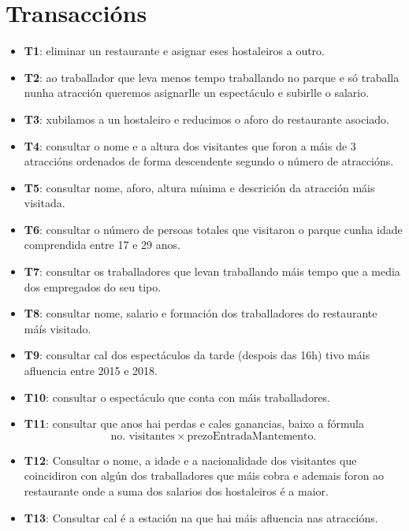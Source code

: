 \documentclass[12pt,a4paper]{book}
\theoremstyle{definition}
\theoremstyle{break}
\begin{document}
	\section{Transaccións}
	\begin{itemize}
		\item \textbf{T1}: eliminar un restaurante e asignar eses hostaleiros a outro.
		
		\item \textbf{T2}: ao traballador que leva menos tempo traballando no parque e só traballa nunha atracción queremos asignarlle un espectáculo e subirlle o salario.
		
		\item \textbf{T3}: xubilamos a un hostaleiro e reducimos o aforo do restaurante asociado.
		
		\item \textbf{T4}: consultar o nome e a altura dos visitantes que foron a máis de 3 atraccións ordenados de forma descendente segundo o número de atraccións.
		
		\item \textbf{T5}: consultar nome, aforo, altura mínima e descrición da atracción máis visitada.
		
		\item \textbf{T6}: consultar o número de persoas totales que visitaron o parque cunha idade comprendida entre 17 e 29 anos.
		
		\item \textbf{T7}: consultar os traballadores que levan traballando máis tempo que a media dos empregados do seu tipo.
		
		\item \textbf{T8}: consultar nome, salario e formación dos traballadores do restaurante máís visitado.
		
		\item \textbf{T9}: consultar cal dos espectáculos da tarde (despois das 16h) tivo máis afluencia entre 2015 e 2018.
		
		\item \textbf{T10}: consultar o espectáculo que conta con máis traballadores.
		
		\item \textbf{T11}: consultar que anos hai perdas e cales ganancias, baixo a fórmula
		$$\text{no. visitantes}\times \text{prezoEntradaMantemento}.$$
		
		\item \textbf{T12}: Consultar o nome, a idade e a nacionalidade dos visitantes que coincidiron con algún dos traballadores que máis cobra e ademais foron ao restaurante onde a suma dos salarios dos hostaleiros é a maior.
		
		\item \textbf{T13}: Consultar cal é a estación na que hai máis afluencia nas atraccións.
		
	\end{itemize}
	
\end{document}
